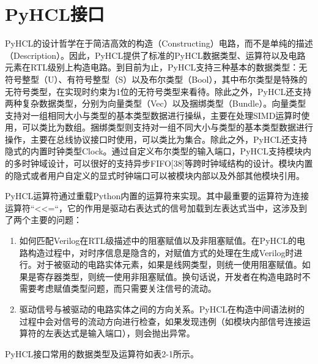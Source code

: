 \section{PyHCL接口}

PyHCL的设计哲学在于简洁高效的构造（Constructing）电路，而不是单纯的描述（Description）。因此，PyHCL提供了标准的PyHCL数据类型、运算符以及电路元素在RTL级别上构造电路。到目前为止，PyHCL支持三种基本的数据类型：无符号整型（U）、有符号整型（S）以及布尔类型（Bool），其中布尔类型是特殊的无符号类型，在实现时约束为1位的无符号类型来看待。除此之外，PyHCL还支持两种复杂数据类型，分别为向量类型（Vec）以及捆绑类型（Bundle）。向量类型支持对一组相同大小与类型的基本类型数据进行操纵，主要在处理SIMD运算时使用，可以类比为数组。捆绑类型则支持对一组不同大小与类型的基本类型数据进行操作，主要在总线协议接口时使用，可以类比为集合。除此之外，PyHCL还支持隐式的内置时钟类型Clock。通过自定义布尔类型的输入端口，PyHCL支持模块内的多时钟域设计，可以很好的支持异步FIFO[38]等跨时钟域结构的设计。模块内置的隐式或者用户自定义的显式时钟端口可以被模块内部以及外部其他模块引用。

PyHCL运算符通过重载Python内置的运算符来实现。其中最重要的运算符为连接运算符“<<=“，它的作用是驱动右表达式的信号加载到左表达式当中，这涉及到了两个主要的问题：

\begin{enumerate}
	\item 如何匹配Verilog在RTL级描述中的阻塞赋值以及非阻塞赋值。在PyHCL的电路构造过程中，对时序信息是隐含的，对赋值方式的处理在生成Verilog时进行。对于被驱动的电路实体元素，如果是线网类型，则统一使用阻塞赋值。如果是寄存器类型，则统一使用非阻塞赋值。换句话说，开发者在构造电路时不需要考虑赋值类型问题，而只需要关注信号的流动。
	\item 驱动信号与被驱动的电路实体之间的方向关系。PyHCL在构造中间语法树的过程中会对信号的流动方向进行检查，如果发现违例（如模块内部信号连接运算符的左表达式是输入端口），则会抛出异常。
\end{enumerate}

PyHCL接口常用的数据类型及运算符如表2-1所示。


